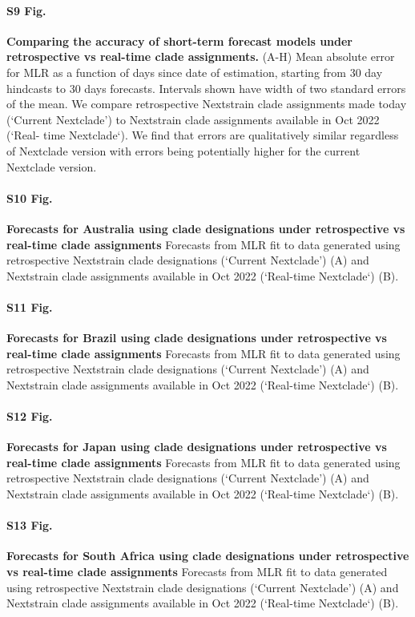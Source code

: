 \documentclass[10pt,letterpaper]{article}
\begin{document}
\paragraph*{S9 Fig.}
\label{fig:S9}
{\bf Comparing the accuracy of short-term forecast models under retrospective vs real-time clade assignments.}
(A-H) Mean absolute error for MLR as a function of days
since date of estimation, starting from 30 day hindcasts to 30 days forecasts. Intervals shown have
width of two standard errors of the mean. We compare retrospective Nextstrain clade assignments
made today (‘Current Nextclade’) to Nextstrain clade assignments available in Oct 2022 (‘Real-
time Nextclade‘). We find that errors are qualitatively similar regardless of Nextclade version with
errors being potentially higher for the current Nextclade version.

\paragraph*{S10 Fig.}
\label{fig:S10}
{\bf Forecasts for Australia using clade designations under retrospective vs real-time clade assignments}
Forecasts from MLR fit to data generated using retrospective Nextstrain clade designations (‘Current Nextclade’) (A) and Nextstrain clade assignments available
in Oct 2022 (‘Real-time Nextclade‘) (B). 

\paragraph*{S11 Fig.}
\label{fig:S11}
{\bf Forecasts for Brazil using clade designations under retrospective vs real-time clade assignments}
Forecasts from MLR fit to data generated using retrospective Nextstrain
clade designations (‘Current Nextclade’) (A) and Nextstrain clade assignments available in Oct
2022 (‘Real-time Nextclade‘) (B).

\paragraph*{S12 Fig.}
\label{fig:S12}
{\bf Forecasts for Japan using clade designations under retrospective vs real-time clade assignments}
Forecasts from MLR fit to data generated using retrospective Nextstrain
clade designations (‘Current Nextclade’) (A) and Nextstrain clade assignments available in Oct
2022 (‘Real-time Nextclade‘) (B).

\paragraph*{S13 Fig.}
\label{fig:S13}
{\bf Forecasts for South Africa using clade designations under retrospective vs real-time clade assignments }
Forecasts from MLR fit to data generated using retrospective Nextstrain clade designations (‘Current Nextclade’) (A) and Nextstrain clade assignments available
in Oct 2022 (‘Real-time Nextclade‘) (B).
\end{document}
